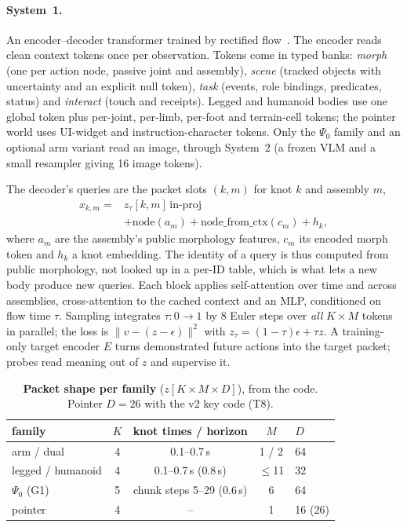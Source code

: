 \documentclass[10pt,twocolumn]{article}
\begin{document}
\paragraph{System~1.} An encoder--decoder transformer trained by rectified flow~\cite{rectflow,fm}. The encoder reads clean context tokens once per observation. Tokens come in typed banks: \emph{morph} (one per action node, passive joint and assembly), \emph{scene} (tracked objects with uncertainty and an explicit null token), \emph{task} (events, role bindings, predicates, status) and \emph{interact} (touch and receipts). Legged and humanoid bodies use one global token plus per-joint, per-limb, per-foot and terrain-cell tokens; the pointer world uses UI-widget and instruction-character tokens. Only the $\Psi_0$ family and an optional arm variant read an image, through System~2 (a frozen VLM and a small resampler giving 16 image tokens).

The decoder's queries are the packet slots $(k,m)$ for knot $k$ and assembly $m$,
\begin{equation}
\begin{aligned}x_{k,m}={}&z_{\tau}[k,m]\,\text{in-proj}\\&+\mathrm{node}(a_m)+\mathrm{node\_from\_ctx}(c_m)+h_k,\end{aligned}
\label{eq:query}
\end{equation}
where $a_m$ are the assembly's public morphology features, $c_m$ its encoded morph token and $h_k$ a knot embedding. The identity of a query is thus computed from public morphology, not looked up in a per-ID table, which is what lets a new body produce new queries. Each block applies self-attention over time and across assemblies, cross-attention to the cached context and an MLP, conditioned on flow time $\tau$. Sampling integrates $\tau:0\to1$ by $8$ Euler steps over \emph{all} $K\times M$ tokens in parallel; the loss is $\lVert v-(z-\epsilon)\rVert^2$ with $z_\tau=(1-\tau)\epsilon+\tau z$. A training-only target encoder $E$ turns demonstrated future actions into the target packet; probes read meaning out of $z$ and supervise it.

\begin{table}[t]\centering\small
\caption{\textbf{Packet shape per family} ($z[K{\times}M{\times}D]$), from the code. Pointer $D{=}26$ with the v2 key code (T8).}\label{tab:packet}
\setlength{\tabcolsep}{3.5pt}
\begin{tabular}{@{}lcccl@{}}\toprule
family & $K$ & knot times / horizon & $M$ & $D$\\\midrule
arm / dual & 4 & 0.1--0.7\,s & 1 / 2 & 64\\
legged / humanoid & 4 & 0.1--0.7\,s (0.8\,s) & $\le$11 & 32\\
$\Psi_0$ (G1) & 5 & chunk steps 5--29 (0.6\,s) & 6 & 64\\
pointer & 4 & -- & 1 & 16 (26)\\\bottomrule
\end{tabular}
\end{table}
\end{document}
